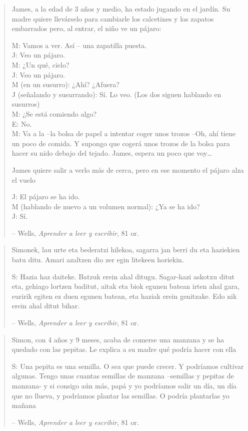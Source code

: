 \documentclass[
]{book}
\begin{document}
\begin{quote}
James, a la edad de 3 años y medio, ha estado jugando en el jardín. Su madre quiere llevárselo para cambiarle los calcetines y los zapatos embarrados pero, al entrar, el niño ve un pájaro:

M: Vamos a ver. Así -- una zapatilla puesta.\\
J: Veo un pájaro.\\
M: ¿Un qué, cielo?\\
J: Veo un pájaro.\\
M (en un susurro): ¿Ahí? ¿Afuera?\\
J (señalando y susurrando): Sí. Lo veo. (Los dos siguen hablando en susurros)\\
M: ¿Se está comiendo algo?\\
E: No.\\
M: Va a la --la bolsa de papel a intentar coger unos trozos --Oh, ahí tiene un poco de comida. Y supongo que cogerá unos trozos de la bolsa para hacer su nido debajo del tejado. James, espera un poco que voy\ldots{}

James quiere salir a verlo más de cerca, pero en ese momento el pájaro alza el vuelo

J: El pájaro se ha ido.\\
M (hablando de nuevo a un volumen normal): ¿Ya se ha ido?\\
J: Sí.

-- Wells, \emph{Aprender a leer y escribir}, 81 or.
\end{quote}

\begin{quote}
Simonek, lau urte eta bederatzi hilekoa, sagarra jan berri du eta haziekien batu ditu. Amari azaltzen dio zer egin litekeen horiekin.

S: Hazia haz daiteke. Batzuk erein ahal ditugu. Sagar-hazi askotxu ditut eta, gehiago lortzen baditut, aitak eta biok egunen batean irten ahal gara, euririk egiten ez duen egunen batean, eta haziak erein genitzake. Edo nik erein ahal ditut bihar.

-- Wells, \emph{Aprender a leer y escribir}, 81 or.
\end{quote}

\begin{quote}
Simon, con 4 años y 9 meses, acaba de comerse una manzana y se ha quedado con las pepitas. Le explica a su madre qué podría hacer con ella

S: Una pepita es una semilla. O sea que puede crecer. Y podríamos cultivar algunas. Tengo unas cuantas semillas de manzana --semillas y pepitas de manzana- y si consigo aún más, papá y yo podríamos salir un día, un día que no llueva, y podríamos plantar las semillas. O podría plantarlas yo mañana

-- Wells, \emph{Aprender a leer y escribir}, 81 or.
\end{quote}
\end{document}

